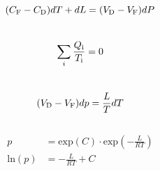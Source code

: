 \begin{equation}
    (C_\text{F}-C_\text{D})dT + dL = (V_\text{D}-V_\text{F})dP\\
    \label{eqn:long}
\end{equation}
\\
\begin{equation}
    \sum_{i}\frac{Q_\text{i}}{T_\text{i}}=0\\
    \label{eqn:sum}
\end{equation}
\\
\begin{equation}
    (V_\text{D}-V_\text{F})dp =\frac{L}{T}dT\\
    \label{eqn:sum}
\end{equation}
\\
\begin{align}
p &= \text{exp}(C)\cdot \text{exp}\left(-\frac{L}{RT}\right)\\
\text{ln}(p)&= -\frac{L}{RT} + C
\end{align}

